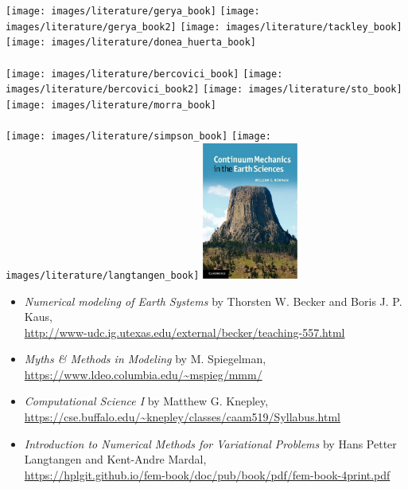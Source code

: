 
\begin{center}
\texttt{[image: images/literature/gerya\_book]}
\texttt{[image: images/literature/gerya\_book2]}
\texttt{[image: images/literature/tackley\_book]}
\texttt{[image: images/literature/donea\_huerta\_book]}\\
\cite{gery10}     \hspace{1.99cm} 
\cite{gery19book} \hspace{1.99cm} 
\cite{tack10}     \hspace{1.99cm} 
\cite{dohu03}  \\
\texttt{[image: images/literature/bercovici\_book]}
\texttt{[image: images/literature/bercovici\_book2]}
\texttt{[image: images/literature/sto\_book]}
\texttt{[image: images/literature/morra\_book]}\\
\cite{berc09} \hspace{1.99cm} 
\cite{berc15} \hspace{1.99cm} 
\cite{scto01} \hspace{1.99cm} 
\cite{morr18} \\ 
\texttt{[image: images/literature/simpson\_book]}
\texttt{[image: images/literature/langtangen\_book]}
\includegraphics[height=4.5cm]{images/literature/newman} \\
\cite{simp17} \hspace{1.99cm}
\cite{lang08} \hspace{1.99cm}
\cite{newman2012}
\end{center}

\begin{itemize}
\item {\it Numerical modeling of Earth Systems} by Thorsten W. Becker and Boris J. P. Kaus,\\ 
\url{http://www-udc.ig.utexas.edu/external/becker/teaching-557.html}

\item {\it Myths \& Methods in Modeling} by M. Spiegelman,\\
 \url{https://www.ldeo.columbia.edu/~mspieg/mmm/}

\item {\it Computational Science I} by Matthew G. Knepley,\\
 \url{https://cse.buffalo.edu/~knepley/classes/caam519/Syllabus.html}

\item {\it Introduction to Numerical Methods for Variational Problems} by Hans Petter Langtangen and 
Kent-Andre Mardal, \\
\url{https://hplgit.github.io/fem-book/doc/pub/book/pdf/fem-book-4print.pdf}
\end{itemize}

